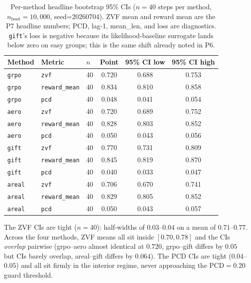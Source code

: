 \documentclass{article}
\begin{document}
\begin{table}[t]
\centering
\caption{Per-method headline bootstrap 95\% CIs
($n{=}40$ steps per method,
$n_{\text{boot}}{=}10{,}000$, seed=20260704). ZVF mean and reward
mean are the P7 headline numbers; PCD, lag-1, mean\_len, and loss
are diagnostics. \texttt{gift}'s loss is negative because its
likelihood-baseline surrogate lands below zero on easy groups; this
is the same shift already noted in P6.}
\label{tab:p7-headline-cis}
\begin{tabular}{lllccc}
\toprule
Method & Metric & $n$ & Point & 95\% CI low & 95\% CI high \\
\midrule
\texttt{grpo}  & \texttt{zvf}          & 40 & 0.720 & 0.688 & 0.753 \\
\texttt{grpo}  & \texttt{reward\_mean} & 40 & 0.834 & 0.810 & 0.858 \\
\texttt{grpo}  & \texttt{pcd}          & 40 & 0.048 & 0.041 & 0.054 \\
\texttt{aero}  & \texttt{zvf}          & 40 & 0.720 & 0.689 & 0.752 \\
\texttt{aero}  & \texttt{reward\_mean} & 40 & 0.828 & 0.803 & 0.852 \\
\texttt{aero}  & \texttt{pcd}          & 40 & 0.050 & 0.043 & 0.056 \\
\texttt{gift}  & \texttt{zvf}          & 40 & 0.770 & 0.731 & 0.809 \\
\texttt{gift}  & \texttt{reward\_mean} & 40 & 0.845 & 0.819 & 0.870 \\
\texttt{gift}  & \texttt{pcd}          & 40 & 0.040 & 0.033 & 0.047 \\
\texttt{areal} & \texttt{zvf}          & 40 & 0.706 & 0.670 & 0.741 \\
\texttt{areal} & \texttt{reward\_mean} & 40 & 0.829 & 0.805 & 0.852 \\
\texttt{areal} & \texttt{pcd}          & 40 & 0.050 & 0.043 & 0.057 \\
\bottomrule
\end{tabular}
\end{table}

The ZVF CIs are tight ($n{=}40$): half-widths of $0.03$--$0.04$
on a mean of $0.71$--$0.77$. Across the four methods, ZVF means
all sit inside $[0.70, 0.78]$ and the CIs \emph{overlap} pairwise
(grpo--aero almost identical at $0.720$, grpo--gift differs by
$0.05$ but CIs barely overlap, areal--gift differs by $0.064$).
The PCD CIs are tight ($0.04$--$0.05$) and all sit firmly in the
interior regime, never approaching the $\mathrm{PCD} = 0.20$ guard
threshold.
\end{document}
